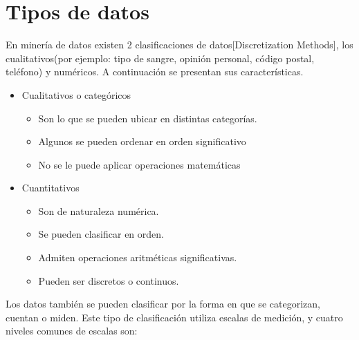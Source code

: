 \section{Tipos de datos}

En minería de datos existen 2 clasificaciones de datos[Discretization Methods], los cualitativos(por ejemplo: tipo de sangre, opinión personal, código postal, teléfono) y numéricos. A continuación se presentan sus características.

\begin{itemize}
\item Cualitativos o categóricos 
	\begin{itemize}
	\item Son lo que se pueden ubicar en distintas  categorías.
	\item Algunos se pueden ordenar en orden significativo
	\item No se le puede aplicar operaciones matemáticas
	\end{itemize}
	 

\item Cuantitativos
	\begin{itemize}
	\item Son de naturaleza numérica. 
	\item Se pueden clasificar en orden. 
	\item Admiten operaciones aritméticas significativas. 
	\item Pueden ser discretos o continuos.		
	\end{itemize}
\end{itemize}

Los datos también se pueden clasificar por la forma en que se categorizan, cuentan o miden. Este tipo de clasificación utiliza escalas de medición, y cuatro niveles comunes de escalas son: 


